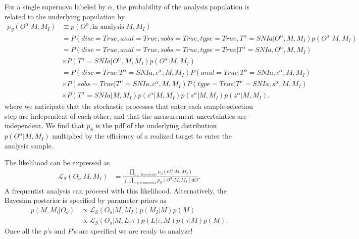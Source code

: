 \documentclass[preprint,3p]{elsarticle}
\begin{document}
For a single supernova labeled by $\alpha$,   the probability of the analysis population is related
to the underlying population by
\begin{align*}
p_S(O^\alpha|M, M_I) &\equiv p(O^\alpha, \text{in analysis}|M, M_I)\\
& = P(disc=True, anal=True, sobs=True, type=True, T^\alpha=SNIa|O^\alpha, M, M_I)p(O^\alpha|M, M_I)\\
& = P(disc=True, anal=True, sobs=True, type=True|T^\alpha=SNIa, O^\alpha, M, M_I)\\
& \times P(T^\alpha=SNIa| O^\alpha, M, M_I)p(O^\alpha|M, M_I)\\
&= P(disc=True|T^\alpha=SNIa,c^\alpha, M, M_I)
P(anal=True|T^\alpha=SNIa,c^\alpha, M, M_I) \\
&  \times P(sobs=True|T^\alpha=SNIa,c^\alpha, M, M_I)
 P(type=True|T^\alpha=SNIa, s^\alpha, M, M_I)\\
&  \times
P(T^\alpha=SNIa| M, M_I)p(c^\alpha|M, M_I)p(s^\alpha|M, M_I)p(z^\alpha|M, M_I).
\end{align*}
where we anticipate that the stochastic processes that enter each sample-selection step
are independent of each other, and that the measurement uncertainties are independent.
We find that $p_S$ is the pdf of the underlying
distribution $p(O^\alpha|M, M_I)$ multiplied by the efficiency of a realized target to
enter the analysis sample.

The likelihood can be expressed as
\begin{align}
\mathcal{L}_S(O_o | M, M_I) & = \frac{\prod_{\alpha \in transients}p_S(O_o^\alpha|M, M_I)}{\int  \prod_{\alpha \in transients} p_S(O^\alpha |M, M_I)dO}.
\label{likelihood:eqn}
\end{align}
A frequentist analysis can proceed with this likelihood.
Alternatively, the Bayesian posterior is specified by parameter priors as 
\begin{align*}
p(M, M_i | O_o) & \propto \mathcal{L}_S(O_o| M, M_I) p(M_I|M) p(M)\\
 & \propto \mathcal{L}_S(O_o| M, L, \tau) p(L| \tau, M) p(\tau|M) p(M).
\end{align*}
Once all the $p$'s and $P$'s are specified we are ready to analyze!


%
\end{document}
